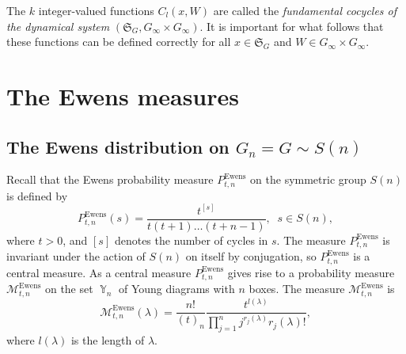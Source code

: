 \documentclass[12pt]{amsart}
\theoremstyle{definition}
\numberwithin{equation}{section}
\DeclareMathOperator{\Y}{\mathbb{Y}}
\DeclareMathOperator{\Ewens}{Ewens}
\begin{document}
The $k$ integer-valued  functions $C_{l}\left(x,W\right)$ are called the \textit{fundamental cocycles of the dynamical system} $\left(\mathfrak{S}_G,G_{\infty}\times G_{\infty}\right)$.
It is important for what follows that these functions can be defined
correctly  for all $x\in\mathfrak{S}_G$ and $W\in G_{\infty}\times G_{\infty}$.
\section{The Ewens measures}
\subsection{The Ewens distribution on $G_n=G\sim S(n)$}
Recall that the Ewens probability measure $P_{t,n}^{\Ewens}$ on the symmetric group $S(n)$ is defined by
\begin{equation}
P_{t,n}^{\Ewens}(s)=\frac{t^{[s]}}{t(t+1)\ldots(t+n-1)},\;\; s\in S(n),
\end{equation}
where $t>0$, and $[s]$ denotes the number of cycles in $s$. The measure $P^{\Ewens}_{t,n}$ is invariant under the action of $S(n)$ on itself by conjugation, so $P_{t,n}^{\Ewens}$ is a central measure. As a central measure
$P_{t,n}^{\Ewens}$ gives rise to a probability measure $\mathcal{M}_{t,n}^{\Ewens}$ on the set $\Y_n$ of Young diagrams with $n$ boxes. The measure $\mathcal{M}_{t,n}^{\Ewens}$ is
\begin{equation}\label{MEwensSymmetric}
\mathcal{M}_{t, n}^{\Ewens}\left(\lambda\right)
=\frac{n!}{(t)_{n}}
\frac{t^{l(\lambda)}}{\prod\limits_{j=1}^{n}j^{r_j(\lambda)}r_j(\lambda)!},
\end{equation}
where $l(\lambda)$ is the length of $\lambda$.
\end{document}
